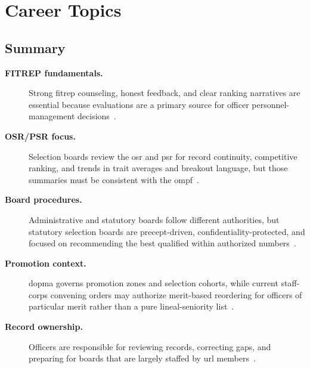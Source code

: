 \documentclass[../main.tex]{subfiles}
\begin{document}
\section{Career Topics}

\subsection{Summary}
\begin{description}
  \item[\textbf{FITREP fundamentals.}] Strong \ac{fitrep} counseling, honest feedback, and clear ranking
  narratives are essential because evaluations are a primary source for officer personnel-management decisions~\autocite{edo-5-2-3-career-topics-2025,BUPERSINST-1610-10H-2025}.
  \item[\textbf{OSR/PSR focus.}] Selection boards review the \ac{osr} and \ac{psr} for record continuity,
  competitive ranking, and trends in trait averages and breakout language, but those summaries must be consistent with the \ac{ompf}~\autocite{edo-5-2-3-career-topics-2025,MyNavyHR-Officer-Record-Update-2026}.
  \item[\textbf{Board procedures.}] Administrative and statutory boards follow different authorities, but statutory
  selection boards are precept-driven, confidentiality-protected, and focused on recommending the best qualified within
  authorized numbers~\autocite{edo-5-2-3-career-topics-2025,MyNavyHR-Selection-Boards-2026}.
  \item[\textbf{Promotion context.}] \ac{dopma} governs promotion zones and selection cohorts, while current
  staff-corps convening orders may authorize merit-based reordering for officers of particular merit rather than a pure
  lineal-seniority list~\autocite{edo-5-2-3-career-topics-2025,MyNavyHR-FY26-Staff-Convening-Order-Merit-Reorder}.
  \item[\textbf{Record ownership.}] Officers are responsible for reviewing records, correcting gaps, and
  preparing for boards that are largely staffed by \ac{url} members~\autocite{edo-5-2-3-career-topics-2025}.
\end{description}
\end{document}
